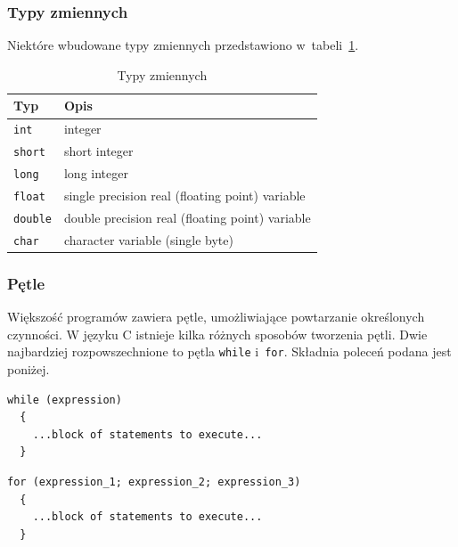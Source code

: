 \subsubsection{Typy zmiennych}

Niektóre wbudowane typy zmiennych przedstawiono w~tabeli~\ref{tab:typyzmiennych}.

\begin{table}[h!]
\centering
\caption{Typy zmiennych}
\setlength{\arrayrulewidth}{1pt}
\setlength{\tabcolsep}{6pt}
\renewcommand{\arraystretch}{1.2}
\begin{tabular}{ |p{}|p{}|}
\hline \rowcolor{gray}
\textbf{Typ} & \textbf{Opis} \\ \hline
\mbox{\lstinline[style=MyBashStyle]{int}} & integer \\ \hline
\mbox{\lstinline[style=MyBashStyle]{short}} & short integer \\ \hline
\mbox{\lstinline[style=MyBashStyle]{long}} & long integer \\ \hline
\mbox{\lstinline[style=MyBashStyle]{float}} & single precision real (floating point) variable \\ \hline
\mbox{\lstinline[style=MyBashStyle]{double}} & double precision real (floating point) variable \\ \hline
\mbox{\lstinline[style=MyBashStyle]{char}} & character variable (single byte) \\ \hline
\end{tabular}
\label{tab:typyzmiennych}
\end{table}

\subsubsection{Pętle}

Większość programów zawiera pętle, umożliwiające powtarzanie określonych czynności. W języku C istnieje kilka różnych sposobów tworzenia pętli. Dwie najbardziej rozpowszechnione to pętla \lstinline[style=MyCStyle]{while} i~\lstinline[style=MyCStyle]{for}. Składnia poleceń podana jest poniżej.


\begin{lstlisting}[style=MyCStyle]
while (expression)
  {
    ...block of statements to execute...
  }
\end{lstlisting}

\begin{lstlisting}[style=MyCStyle]
for (expression_1; expression_2; expression_3)
  {
    ...block of statements to execute...
  }
\end{lstlisting}

